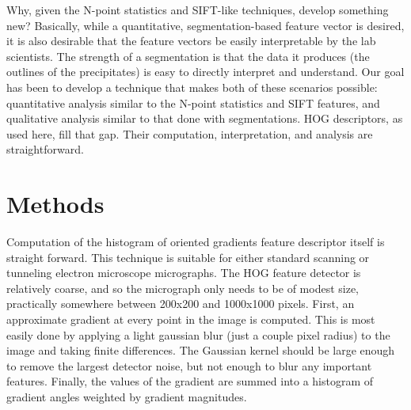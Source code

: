 \documentclass[review]{elsarticle}
\begin{document}
		Why, given the N-point statistics and SIFT-like techniques, develop something new? Basically, while a quantitative, segmentation-based feature vector is desired, it is also desirable that the feature vectors be easily interpretable by the lab scientists. The strength of a segmentation is that the data it produces (the outlines of the precipitates) is easy to directly interpret and understand. Our goal has been to develop a technique that makes both of these scenarios possible: quantitative analysis similar to the N-point statistics and SIFT features, and qualitative analysis similar to that done with segmentations. HOG descriptors, as used here, fill that gap. Their computation, interpretation, and analysis are straightforward.
	
	
	
	

	\section{Methods}\label{methodsandmaterials}
		Computation of the histogram of oriented gradients feature descriptor itself is straight forward. This technique is suitable for either standard scanning or tunneling electron microscope micrographs. The HOG feature detector is relatively coarse, and so the micrograph only needs to be of modest size, practically somewhere between 200x200 and 1000x1000 pixels. First, an approximate gradient at every point in the image is computed. This is most easily done by applying a light gaussian blur (just a couple pixel radius) to the image and taking finite differences. The Gaussian kernel should be large enough to remove the largest detector noise, but not enough to blur any important features. Finally, the values of the gradient are summed into a histogram of gradient angles weighted by gradient magnitudes.
\end{document}
